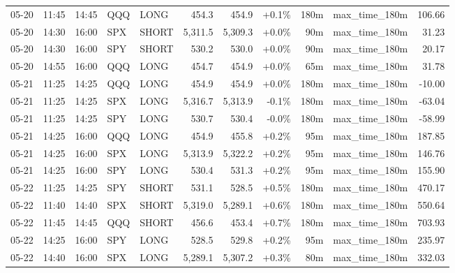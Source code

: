 \documentclass[11pt,a4paper,twoside]{article}
\begin{document}
\begin{center}
\begin{longtable}{>{\color{txtmain}}l l l l l r r r r >{\color{txtmain}}l r}
05-20 & 11:45 & 14:45 & QQQ & LONG & 454.3 & 454.9 & \textcolor{wingreen}{+0.1\%} & 180m & max\_time\_180m & \textcolor{wingreen}{106.66} \\
05-20 & 14:30 & 16:00 & SPX & SHORT & 5,311.5 & 5,309.3 & \textcolor{wingreen}{+0.0\%} & 90m & max\_time\_180m & \textcolor{wingreen}{31.23} \\
05-20 & 14:30 & 16:00 & SPY & SHORT & 530.2 & 530.0 & \textcolor{wingreen}{+0.0\%} & 90m & max\_time\_180m & \textcolor{wingreen}{20.17} \\
05-20 & 14:55 & 16:00 & QQQ & LONG & 454.7 & 454.9 & \textcolor{wingreen}{+0.0\%} & 65m & max\_time\_180m & \textcolor{wingreen}{31.78} \\
05-21 & 11:25 & 14:25 & QQQ & LONG & 454.9 & 454.9 & \textcolor{wingreen}{+0.0\%} & 180m & max\_time\_180m & \textcolor{lossred}{-10.00} \\
05-21 & 11:25 & 14:25 & SPX & LONG & 5,316.7 & 5,313.9 & \textcolor{lossred}{-0.1\%} & 180m & max\_time\_180m & \textcolor{lossred}{-63.04} \\
05-21 & 11:25 & 14:25 & SPY & LONG & 530.7 & 530.4 & \textcolor{lossred}{-0.0\%} & 180m & max\_time\_180m & \textcolor{lossred}{-58.99} \\
05-21 & 14:25 & 16:00 & QQQ & LONG & 454.9 & 455.8 & \textcolor{wingreen}{+0.2\%} & 95m & max\_time\_180m & \textcolor{wingreen}{187.85} \\
05-21 & 14:25 & 16:00 & SPX & LONG & 5,313.9 & 5,322.2 & \textcolor{wingreen}{+0.2\%} & 95m & max\_time\_180m & \textcolor{wingreen}{146.76} \\
05-21 & 14:25 & 16:00 & SPY & LONG & 530.4 & 531.3 & \textcolor{wingreen}{+0.2\%} & 95m & max\_time\_180m & \textcolor{wingreen}{155.90} \\
05-22 & 11:25 & 14:25 & SPY & SHORT & 531.1 & 528.5 & \textcolor{wingreen}{+0.5\%} & 180m & max\_time\_180m & \textcolor{wingreen}{470.17} \\
05-22 & 11:40 & 14:40 & SPX & SHORT & 5,319.0 & 5,289.1 & \textcolor{wingreen}{+0.6\%} & 180m & max\_time\_180m & \textcolor{wingreen}{550.64} \\
05-22 & 11:45 & 14:45 & QQQ & SHORT & 456.6 & 453.4 & \textcolor{wingreen}{+0.7\%} & 180m & max\_time\_180m & \textcolor{wingreen}{703.93} \\
05-22 & 14:25 & 16:00 & SPY & LONG & 528.5 & 529.8 & \textcolor{wingreen}{+0.2\%} & 95m & max\_time\_180m & \textcolor{wingreen}{235.97} \\
05-22 & 14:40 & 16:00 & SPX & LONG & 5,289.1 & 5,307.2 & \textcolor{wingreen}{+0.3\%} & 80m & max\_time\_180m & \textcolor{wingreen}{332.03} \\

\end{longtable}
\end{center}
\end{document}
